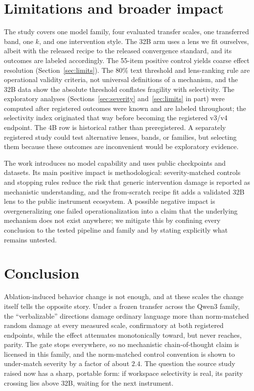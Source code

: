 \documentclass{article}
\begin{document}
\section{Limitations and broader impact}

The study covers one model family, four evaluated transfer scales, one transferred band,
one $k$, and one intervention style. The 32B arm uses a lens we fit ourselves, albeit
with the released recipe to the released convergence standard, and its outcomes are
labeled accordingly. The 55-item positive control yields coarse effect resolution
(Section~\ref{sec:limits}). The 80\% text threshold and lens-ranking rule are operational
validity criteria, not universal definitions of a mechanism, and the 32B data show the
absolute threshold conflates fragility with selectivity. The exploratory analyses
(Sections~\ref{sec:severity} and~\ref{sec:limits} in part) were computed after registered
outcomes were known and are labeled throughout; the selectivity index originated that way
before becoming the registered v3/v4 endpoint. The 4B row is historical rather than
preregistered. A separately registered study could test alternative lenses, bands, or
families, but selecting them because these outcomes are inconvenient would be exploratory
evidence.

The work introduces no model capability and uses public checkpoints and datasets. Its
main positive impact is methodological: severity-matched controls and stopping rules
reduce the risk that generic intervention damage is reported as mechanistic
understanding, and the from-scratch recipe fit adds a validated 32B lens to the public
instrument ecosystem. A possible negative impact is overgeneralizing one failed
operationalization into a claim that the underlying mechanism does not exist anywhere; we
mitigate this by confining every conclusion to the tested pipeline and family and by
stating explicitly what remains untested.

\section{Conclusion}

Ablation-induced behavior change is not enough, and at these scales the change itself
tells the opposite story. Under a frozen transfer across the Qwen3 family, the
``verbalizable'' directions damage ordinary language more than norm-matched random damage
at every measured scale, confirmatory at both registered endpoints, while the effect
attenuates monotonically toward, but never reaches, parity. The gate stops everywhere, so
no mechanistic chain-of-thought claim is licensed in this family, and the norm-matched
control convention is shown to under-match severity by a factor of about $2.4$. The
question the source study raised now has a sharp, portable form: if workspace selectivity
is real, its parity crossing lies above 32B, waiting for the next instrument.
\end{document}
